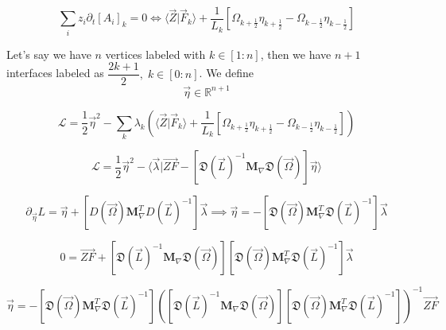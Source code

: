 \documentclass[aps,12pt]{revtex4}
\newcommand{\half}{\frac{1}{2}}
\begin{document}
\begin{equation}
	\sum_i z_i \partial_t [A_i]_k = 0 \iff \langle \vec Z \vert \vec F_k \rangle
	 + \dfrac{1}{L_k}\left[\Omega_{k+\half} \eta_{k+\half} - \Omega_{k-\half} \eta_{k-\half}\right]
\end{equation}

Let's say we have $n$ vertices labeled with $k\in[1:n]$, then we have $n+1$ interfaces labeled as $\dfrac{2k+1}{2},\;k\in[0:n]$.
We define
\begin{equation}
	\vec \eta \in \mathbb R ^ {n+1}
\end{equation}

\begin{equation}
	\mathcal L = \dfrac{1}{2} \vec \eta ^2 - \sum_k \lambda_k \left(\langle \vec Z \vert \vec F_k \rangle
	 + \dfrac{1}{L_k}\left[\Omega_{k+\half} \eta_{k+\half} - \Omega_{k-\half} \eta_{k-\half}\right]\right)
\end{equation}

\begin{equation}
	\mathcal L = \dfrac{1}{2} \vec \eta ^2 - \langle \vec \lambda \vert \vec{ZF} - 
	\left[\mathfrak D (\vec L)^{-1} \bm M_\nabla \mathfrak D(\vec\Omega)\right] \vec \eta \rangle
\end{equation}

\begin{equation}
	\partial_{\vec \eta} L = \vec \eta +\left[ D(\vec\Omega) \bm M_\nabla ^T D (\vec L)^{-1} \right] \vec \lambda
	\implies \vec \eta = - \left[ \mathfrak D(\vec\Omega) \bm M_\nabla ^T \mathfrak D (\vec L)^{-1} \right] \vec \lambda
\end{equation}

\begin{equation}
	0 = \vec {ZF} + \left[\mathfrak D (\vec L)^{-1} \bm M_\nabla \mathfrak D(\vec\Omega)\right] 
	\left[ \mathfrak D(\vec\Omega) \bm M_\nabla ^T \mathfrak D (\vec L)^{-1} \right] \vec \lambda
\end{equation}

\begin{equation}
	\vec \eta = - \left[ \mathfrak D(\vec\Omega) \bm M_\nabla ^T \mathfrak D (\vec L)^{-1} \right] \left( \left[\mathfrak D (\vec L)^{-1} \bm M_\nabla \mathfrak D(\vec\Omega)\right] \left[ \mathfrak D(\vec\Omega) \bm M_\nabla ^T \mathfrak D (\vec L)^{-1} \right]\right) ^{-1} \vec{ZF}
\end{equation}
\end{document}
